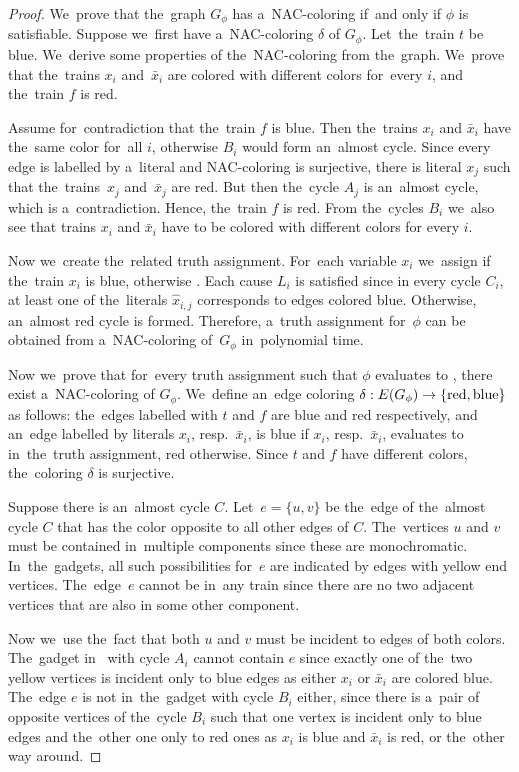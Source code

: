 \begin{proof}
	We~prove that the~graph $G_\phi$ has a~NAC-coloring if~and only if
	$\phi$ is satisfiable.
	Suppose we~first have a~NAC-coloring $\delta$ of $G_\phi$.
	Let~the~train $t$ be blue.
	We~derive some properties of the~NAC-coloring from the~graph.
	We~prove that the~trains $x_i$ and~$\bar{x}_i$
	are colored with different colors for~every $i$,
	and the~train $f$ is red.

	Assume for~contradiction that the~train $f$ is blue.
	Then the~trains $x_i$ and $\bar{x}_i$ have the~same color for~all $i$,
	otherwise $B_i$ would form an~almost cycle.
	Since every edge is labelled by a~literal and NAC-coloring is surjective,
	there is literal $x_j$ such that the~trains~$x_j$ and~$\bar{x}_j$ are red.
	But then the~cycle $A_j$ is an~almost cycle, which is a~contradiction.
	Hence, the~train $f$ is red.
	From the~cycles $B_i$ we~also see
	that trains $x_i$ and $\bar{x}_i$ have to be colored with different colors
	for every $i$.

	Now we~create the~related truth assignment.
	For~each variable $x_i$ we~assign \true{} if
	the~train $x_i$ is blue,
	otherwise \false{}.
	Each cause $L_i$ is satisfied since
	in every cycle $C_i$, at least one of
	the~literals $\hat{x}_{i,j}$ corresponds to edges colored blue.
	Otherwise, an~almost red cycle is formed.
	Therefore, a~truth assignment for~$\phi$ can be obtained
	from a~NAC-coloring of~$G_\phi$ in~polynomial time.

	Now we~prove that for~every truth assignment such that $\phi$ evaluates to \true{}, there exist
	a~NAC-coloring of $G_\phi$. We~define an~edge coloring
	$\delta: E(G_\phi) \to \{\text{red}, \text{blue}\}$ as follows:
	the~edges labelled with $t$ and $f$ are blue and red respectively,
	and an~edge labelled by literals $x_i$, resp.\ $\bar{x}_i$, is blue
	if $x_i$, resp.\ $\bar{x}_i$, evaluates to \true{} in~the~truth assignment, red otherwise.
	Since $t$ and $f$ have different colors,
	the~coloring $\delta$ is surjective.

	Suppose there is an~almost cycle $C$.
	Let~$e=\{u, v\}$ be the~edge of the~almost cycle $C$ that has the color opposite
	to all other edges of $C$.
	The~vertices $u$ and $v$ must be contained in~multiple \trcon{} components
	since these are monochromatic.
	In~the~gadgets, all such possibilities for~$e$ are indicated by edges with yellow end vertices.
	The~edge~$e$ cannot be in~any train since there are no two adjacent vertices that are also
	in some other \trcon{} component.

	Now we~use the~fact that both $u$ and $v$ must be incident to edges of both colors.
	The~gadget in~ with cycle $A_i$
	cannot contain $e$ since exactly one of the~two yellow vertices is incident only to blue edges
	as either $x_i$ or $\bar{x}_i$ are colored blue.
	The~edge $e$ is not in~the~gadget with cycle $B_i$ either,
	since there is a~pair of opposite vertices of the~cycle $B_i$
	such that one vertex is incident only to blue edges and the~other one only to red ones
	as $x_i$ is blue and $\bar{x}_i$ is red, or the~other way around.


\end{proof}
